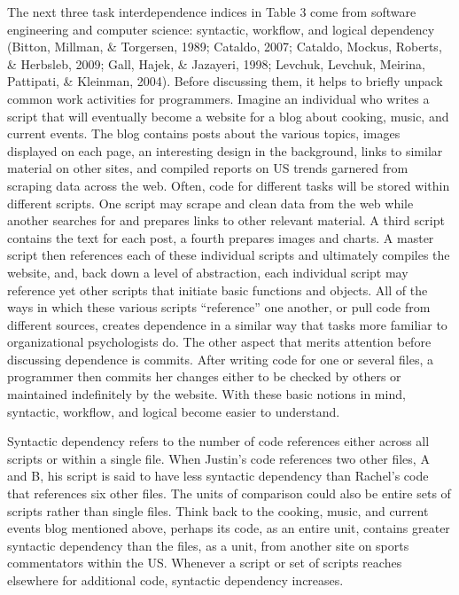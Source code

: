 \documentclass[english,,man]{apa6}
\theoremstyle{definition}
\theoremstyle{definition}
\theoremstyle{definition}
\theoremstyle{remark}
\begin{document}
The next three task interdependence indices in Table 3 come from
software engineering and computer science: syntactic, workflow, and
logical dependency (Bitton, Millman, \& Torgersen, 1989; Cataldo, 2007;
Cataldo, Mockus, Roberts, \& Herbsleb, 2009; Gall, Hajek, \& Jazayeri,
1998; Levchuk, Levchuk, Meirina, Pattipati, \& Kleinman, 2004). Before
discussing them, it helps to briefly unpack common work activities for
programmers. Imagine an individual who writes a script that will
eventually become a website for a blog about cooking, music, and current
events. The blog contains posts about the various topics, images
displayed on each page, an interesting design in the background, links
to similar material on other sites, and compiled reports on US trends
garnered from scraping data across the web. Often, code for different
tasks will be stored within different scripts. One script may scrape and
clean data from the web while another searches for and prepares links to
other relevant material. A third script contains the text for each post,
a fourth prepares images and charts. A master script then references
each of these individual scripts and ultimately compiles the website,
and, back down a level of abstraction, each individual script may
reference yet other scripts that initiate basic functions and objects.
All of the ways in which these various scripts \enquote{reference} one
another, or pull code from different sources, creates dependence in a
similar way that tasks more familiar to organizational psychologists do.
The other aspect that merits attention before discussing dependence is
commits. After writing code for one or several files, a programmer then
commits her changes either to be checked by others or maintained
indefinitely by the website. With these basic notions in mind,
syntactic, workflow, and logical become easier to understand.

Syntactic dependency refers to the number of code references either
across all scripts or within a single file. When Justin's code
references two other files, A and B, his script is said to have less
syntactic dependency than Rachel's code that references six other files.
The units of comparison could also be entire sets of scripts rather than
single files. Think back to the cooking, music, and current events blog
mentioned above, perhaps its code, as an entire unit, contains greater
syntactic dependency than the files, as a unit, from another site on
sports commentators within the US. Whenever a script or set of scripts
reaches elsewhere for additional code, syntactic dependency increases.
\end{document}
